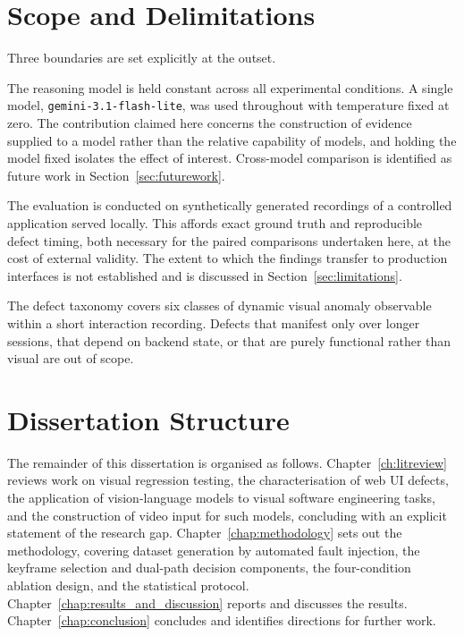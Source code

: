 \section{Scope and Delimitations}
\label{sec:scope}

Three boundaries are set explicitly at the outset.

The reasoning model is held constant across all experimental conditions. A
single model, \texttt{gemini-3.1-flash-lite}, was used throughout with
temperature fixed at zero. The contribution claimed here concerns the
construction of evidence supplied to a model rather than the relative
capability of models, and holding the model fixed isolates the effect of
interest. Cross-model comparison is identified as future work in
Section~\ref{sec:futurework}.

The evaluation is conducted on synthetically generated recordings of a
controlled application served locally. This affords exact ground truth and
reproducible defect timing, both necessary for the paired comparisons
undertaken here, at the cost of external validity. The extent to which the
findings transfer to production interfaces is not established and is
discussed in Section~\ref{sec:limitations}.

The defect taxonomy covers six classes of dynamic visual anomaly
observable within a short interaction recording. Defects that manifest
only over longer sessions, that depend on backend state, or that are
purely functional rather than visual are out of scope.


\section{Dissertation Structure}
\label{sec:structure}

The remainder of this dissertation is organised as follows.
Chapter~\ref{ch:litreview} reviews work on visual regression testing, the
characterisation of web UI defects, the application of vision-language
models to visual software engineering tasks, and the construction of video
input for such models, concluding with an explicit statement of the
research gap. Chapter~\ref{chap:methodology} sets out the methodology,
covering dataset generation by automated fault injection, the keyframe
selection and dual-path decision components, the four-condition ablation
design, and the statistical protocol.
Chapter~\ref{chap:results_and_discussion} reports and discusses the
results. Chapter~\ref{chap:conclusion} concludes and identifies directions
for further work.